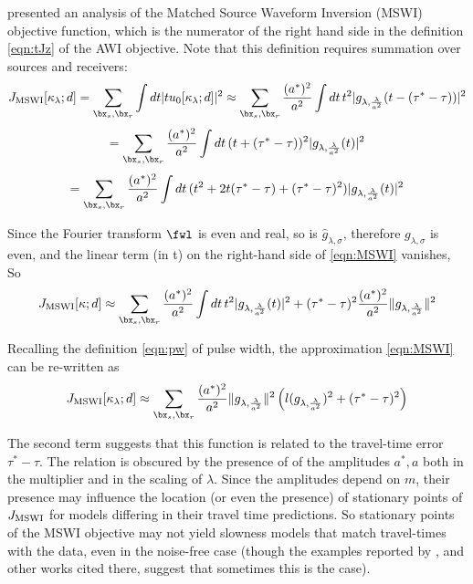 \cite{HuangSymes2015SEG} presented an analysis of the Matched Source
Waveform Inversion (MSWI) objective function, which is the numerator
of the right hand side in the definition \ref{eqn:tJz} of the AWI
objective. Note that this definition requires summation over sources and receivers:
\[
J_{\rm MSWI}[\kappa_{\lambda};d] = \sum_{\bx_s,\bx_r}\int dt |tu_0[\kappa_{\lambda};d]|^2 \approx \sum_{\bx_s,\bx_r}\frac{(a^*)^2}{a^2} \int dt\, t^2|g_{\lambda,\frac{\lambda}{a^2}}(t-(\tau^*-\tau))|^2
\]
\[
=\sum_{\bx_s,\bx_r}\frac{(a^*)^2}{a^2} \int dt\, (t+(\tau^*-\tau))^2|g_{\lambda,\frac{\lambda}{a^2}}(t)|^2
\]
\begin{equation}
  \label{eqn:MSWI}
  =\sum_{\bx_s,\bx_r}\frac{(a^*)^2}{a^2} \int dt\, (t^2 + 2t
  (\tau^*-\tau)+(\tau^*-\tau)^2)|g_{\lambda,\frac{\lambda}{a^2}}(t)|^2
\end{equation}

Since the Fourier transform $\fwl$ is even and real, so is
$\hat{g}_{\lambda,\sigma}$, therefore $g_{\lambda,\sigma}$ is even, and the linear term (in t) on the
right-hand side of \ref{eqn:MSWI} vanishes, So
\begin{equation}
  \label{eqn:MSWIasym}
  J_{\rm MSWI}[\kappa;d] \approx
\sum_{\bx_s,\bx_r}\frac{(a^*)^2}{a^2} \int dt\, t^2|g_{\lambda,\frac{\lambda}{a^2}}(t)|^2
+(\tau^*-\tau)^2\frac{(a^*)^2}{a^2}\|g_{\lambda,\frac{\lambda}{a^2}}\|^2
\end{equation}

Recalling the definition \ref{eqn:pw} of pulse width, the
approximation \ref{eqn:MSWI} can be re-written as
\begin{equation}
  J_{\rm MSWI}[\kappa_{\lambda};d] \approx
  \sum_{\bx_s,\bx_r}\frac{(a^*)^2}{a^2}\|g_{\lambda,\frac{\lambda}{a^2}}\|^2\left(l(g_{\lambda,\frac{\lambda}{a^2}})^2  + (\tau^*-\tau)^2\right)
\end{equation}

The second term suggests that this function
is related to the travel-time error $\tau^*-\tau$.
The relation is obscured by the presence of of the amplitudes
$a^*, a$ both in the multiplier and in the scaling of $\lambda$. Since the
amplitudes depend on $m$, their presence may influence the location
(or even the presence) of stationary points of $J_{\rm MSWI}$ for
models differing in their travel time predictions. So stationary
points of the MSWI objective may not yield slowness models that match
travel-times with the data, even in the noise-free case (though
the examples reported by \cite{HuangSymes2015SEG, HuangSymes:Geo17}, and other works
cited there, suggest that sometimes this is the case).


